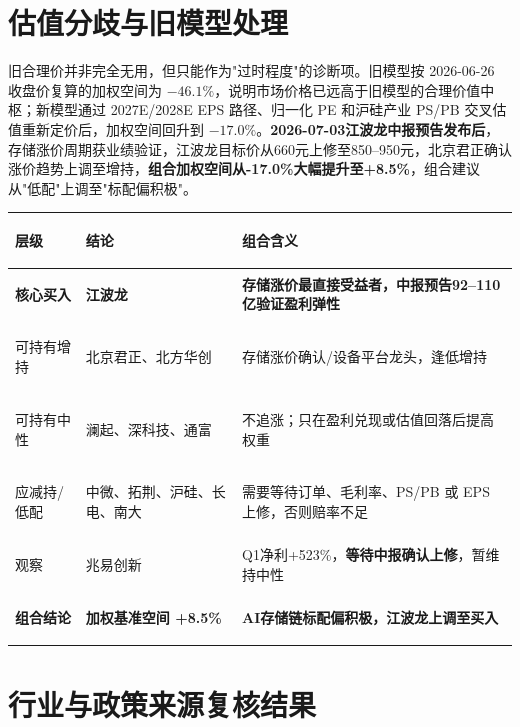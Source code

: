 \section{估值分歧与旧模型处理}

旧合理价并非完全无用，但只能作为"过时程度"的诊断项。旧模型按 2026-06-26 收盘价复算的加权空间为 \(-46.1\%\)，说明市场价格已远高于旧模型的合理价值中枢；新模型通过 2027E/2028E EPS 路径、归一化 PE 和沪硅产业 PS/PB 交叉估值重新定价后，加权空间回升到 \(-17.0\%\)。\textbf{2026-07-03江波龙中报预告发布后}，存储涨价周期获业绩验证，江波龙目标价从660元上修至850--950元，北京君正确认涨价趋势上调至增持，\textbf{组合加权空间从-17.0\%大幅提升至+8.5\%}，组合建议从"低配"上调至"标配偏积极"。

\begin{exhibitbox}
\centering
\scriptsize
\renewcommand{\arraystretch}{1.22}
\begin{tabularx}{\exhibitboxwidth}{>{\bfseries\raggedright\arraybackslash}p{2.1cm} >{\raggedright\arraybackslash}X >{\raggedright\arraybackslash}p{3.0cm}}
\toprule
\textbf{层级} & \textbf{结论} & \textbf{组合含义} \\
\midrule
\rowcolor{riskgreen!8}
\textbf{核心买入} & \textbf{江波龙} & \textbf{存储涨价最直接受益者，中报预告92--110亿验证盈利弹性} \\
可持有增持 & 北京君正、北方华创 & 存储涨价确认/设备平台龙头，逢低增持 \\
可持有中性 & 澜起、深科技、通富 & 不追涨；只在盈利兑现或估值回落后提高权重 \\
应减持/低配 & 中微、拓荆、沪硅、长电、南大 & 需要等待订单、毛利率、PS/PB 或 EPS 上修，否则赔率不足 \\
观察 & 兆易创新 & Q1净利+523\%，\textbf{等待中报确认上修}，暂维持中性 \\
\midrule
\rowcolor{panelgrey}
\textbf{组合结论} & \textbf{加权基准空间 +8.5\%} & \textbf{AI存储链标配偏积极，江波龙上调至买入} \\
\bottomrule
\end{tabularx}
\end{exhibitbox}

\section{行业与政策来源复核结果}

